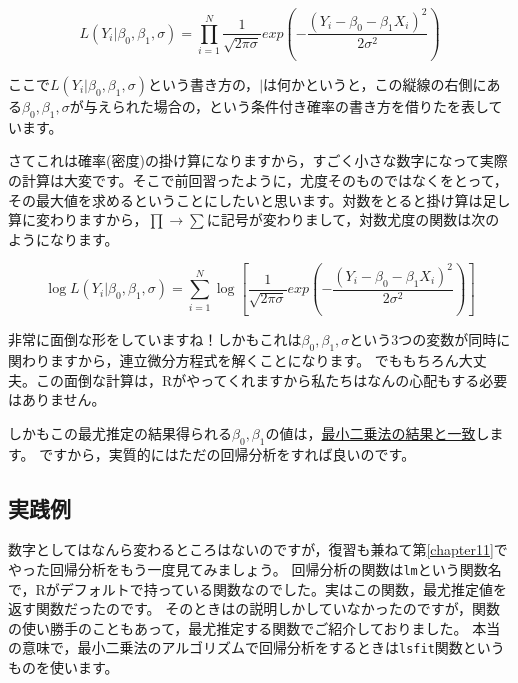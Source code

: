 \documentclass{ltjbook}
\begin{document}
\[ L(Y_i | \beta_0,\beta_1,\sigma) = \prod_{i=1}^N \frac{1}{\sqrt{2\pi \sigma}}exp\left(- \frac{(Y_i-\beta_0 - \beta_1 X_i)^2}{2\sigma^2}\right)\]

ここで$L(Y_i | \beta_0,\beta_1,\sigma) $という書き方の，$\mid$は何かというと，この縦線の右側にある$\beta_0,\beta_1,\sigma$が与えられた場合の，という条件付き確率の書き方を借りたを表しています。

さてこれは確率(密度)の掛け算になりますから，すごく小さな数字になって実際の計算は大変です。そこで前回習ったように，尤度そのものではなくをとって，その最大値を求めるということにしたいと思います。対数をとると掛け算は足し算に変わりますから，$\prod \to \sum$に記号が変わりまして，対数尤度の関数は次のようになります。

\[ \log L(Y_i | \beta_0,\beta_1,\sigma) = \sum_{i=1}^N \log \left[ \frac{1}{\sqrt{2\pi \sigma}}exp\left( -\frac{(Y_i-\beta_0 - \beta_1 X_i)^2}{2\sigma^2}\right)\right]\]

非常に面倒な形をしていますね！しかもこれは$\beta_0,\beta_1,\sigma$という3つの変数が同時に関わりますから，連立微分方程式を解くことになります。
でももちろん大丈夫。この面倒な計算は，Rがやってくれますから私たちはなんの心配もする必要はありません。

しかもこの最尤推定の結果得られる$\beta_0,\beta_1$の値は，\underline{最小二乗法の結果と一致}します。
ですから，実質的にはただの回帰分析をすれば良いのです。

\subsection{実践例}
数字としてはなんら変わるところはないのですが，復習も兼ねて第\ref{chapter11}でやった回帰分析をもう一度見てみましょう。
回帰分析の関数は\verb|lm|という関数名で，Rがデフォルトで持っている関数なのでした。実はこの関数，最尤推定値を返す関数だったのです。
そのときはの説明しかしていなかったのですが，関数の使い勝手のこともあって，最尤推定する関数でご紹介しておりました。
本当の意味で，最小二乗法のアルゴリズムで回帰分析をするときは\verb|lsfit|関数というものを使います。
\end{document}
